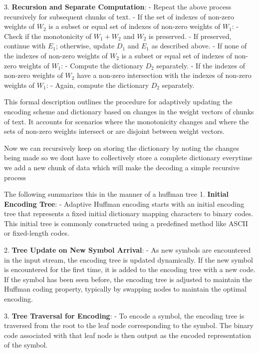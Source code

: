 \documentclass[scrartcl]{article}
\begin{document}
   3. \textbf{Recursion and Separate Computation}:
      - Repeat the above process recursively for subsequent chunks of text.
      - If the set of indexes of non-zero weights of \( W_2 \) is a subset or equal set of indexes of non-zero weights of \( W_1 \):
        - Check if the monotonicity of \( W_1 + W_2 \) and \( W_2 \) is preserved.
        - If preserved, continue with \( E_1 \); otherwise, update \( D_1 \) and \( E_1 \) as described above.
      - If none of the indexes of non-zero weights of \( W_2 \) is a subset or equal set of indexes of non-zero weights of \( W_1 \):
        - Compute the dictionary \( D_2 \) separately.
      - If the indexes of non-zero weights of \( W_2 \) have a non-zero intersection with the indexes of non-zero weights of \( W_1 \):
        - Again, compute the dictionary \( D_2 \) separately.
   
   This formal description outlines the procedure for adaptively updating the encoding scheme and dictionary based on changes in the weight vectors of chunks of text. It accounts for scenarios where the monotonicity changes and where the sets of non-zero weights intersect or are disjoint between weight vectors.
   
   Now we can recursively keep on storing the dictionary by noting the changes being made so we dont have to collectively store a complete dictionary everytime we add a new chunk of data which will make the decoding a simple recursive process
   
   The following summarizes this in the manner of a huffman tree 
   1. \textbf{Initial Encoding Tree}: 
      - Adaptive Huffman encoding starts with an initial encoding tree that represents a fixed initial dictionary mapping characters to binary codes. This initial tree is commonly constructed using a predefined method like ASCII or fixed-length codes.
   
   2. \textbf{Tree Update on New Symbol Arrival}: 
      - As new symbols are encountered in the input stream, the encoding tree is updated dynamically. If the new symbol is encountered for the first time, it is added to the encoding tree with a new code. If the symbol has been seen before, the encoding tree is adjusted to maintain the Huffman coding property, typically by swapping nodes to maintain the optimal encoding.
   
   3. \textbf{Tree Traversal for Encoding}: 
      - To encode a symbol, the encoding tree is traversed from the root to the leaf node corresponding to the symbol. The binary code associated with that leaf node is then output as the encoded representation of the symbol.
   
\end{document}
